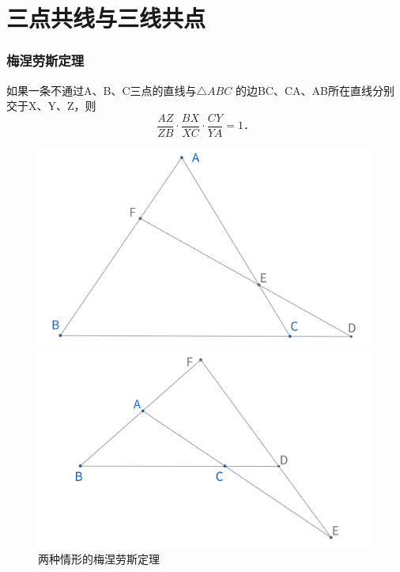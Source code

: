 \part{三点共线与三线共点}
\section{梅涅劳斯定理}
\begin{theorem}
    如果一条不通过A、B、C三点的直线与$\triangle ABC$ 的边BC、CA、AB所在直线分别交于X、Y、Z，则 
    $$\frac{A Z}{Z B} \cdot \frac{B X}{X C} \cdot \frac{C Y}{Y A}=1．$$ 
\end{theorem}


\begin{figure}[H]
    \centering
    \begin{minipage}[t]{0.45\textwidth}
        \centering
        \includegraphics[width=\linewidth]{figures/menelaus1.png}
    \end{minipage}
    \hfill %
    \begin{minipage}[t]{0.45\textwidth}
    \centering
    \includegraphics[width=\linewidth]{figures/menelaus2.png}
    \end{minipage}
    \caption{两种情形的梅涅劳斯定理}
\end{figure}


